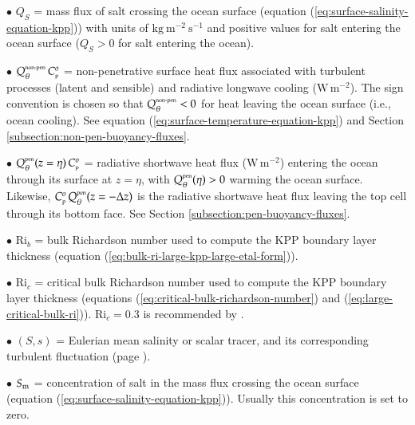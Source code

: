 \begin{trivlist}
\item[$\bullet$] $Q_{S}$ = mass flux of salt crossing the ocean
  surface (equation (\ref{eq:surface-salinity-equation-kpp})) with
  units of $\mbox{kg}~\mbox{m}^{-2}~\mbox{s}^{-1}$ and positive values
  for salt entering the ocean surface ($Q_{S} > 0$ for salt entering
  the ocean).

\item[$\bullet$] $Q_{\theta}^{\mbox{\tiny non-pen}} \, C_{\mbox{\tiny p}}^{o}$ =
  non-penetrative surface heat flux associated with turbulent
  processes (latent and sensible) and radiative longwave cooling
  ($\mbox{W} \, \mbox{m}^{-2}$).  The sign convention is chosen so
  that $Q_{\theta}^{\mbox{\tiny non-pen}} < 0$ for heat leaving the
  ocean surface (i.e., ocean cooling).  See equation
  (\ref{eq:surface-temperature-equation-kpp}) and Section
  \ref{subsection:non-pen-buoyancy-fluxes}.

\item[$\bullet$] $Q_{\theta}^{\mbox{\tiny pen}}(z=\eta) \, C_{\mbox{\tiny p}}^{o}$ = radiative
  shortwave heat flux ($\mbox{W} \, \mbox{m}^{-2}$) entering the ocean
  through its surface at $z=\eta$, with $Q_{\theta}^{\mbox{\tiny
      pen}}(\eta) > 0$ warming the ocean surface.  Likewise, $C_{\mbox{\tiny p}}^{o} \,
  Q_{\theta}^{\mbox{\tiny pen}}(z=-\Delta z)$ is the radiative
  shortwave heat flux leaving the top cell through its bottom face.
  See Section \ref{subsection:pen-buoyancy-fluxes}.

\item[$\bullet$] $\mbox{Ri}_{b}$ = bulk Richardson number used to
  compute the KPP boundary layer thickness (equation
  (\ref{eq:bulk-ri-large-kpp-large-etal-form})).

\item[$\bullet$] $\mbox{Ri}_{c}$ = critical bulk Richardson number
  used to compute the KPP boundary layer thickness (equations
  (\ref{eq:critical-bulk-richardson-number}) and
  (\ref{eq:large-critical-bulk-ri})).  $\mbox{Ri}_{c} = 0.3$ is
  recommended by \cite{LargeKPP}.

\item[$\bullet$] $(S,s)$ = Eulerian mean salinity or scalar tracer,
  and its corresponding turbulent fluctuation (page
  \pageref{Lambda_defined}).

\item[$\bullet$] $S_{\mbox{\scriptsize m}}$ = concentration of salt in the mass flux
  crossing the ocean surface (equation
  (\ref{eq:surface-salinity-equation-kpp})).  Usually this
  concentration is set to zero.


\end{trivlist}
